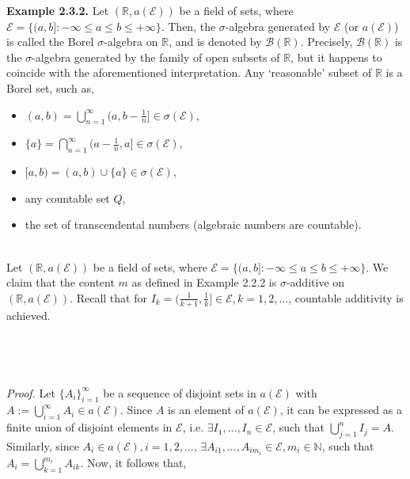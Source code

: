 \documentclass{article}
\begin{document}
\textbf{Example 2.3.2.} Let $(\mathbb{R}, a(\mathcal{E}))$ be a field of sets, where $\mathcal{E} = \{(a,b]: -\infty \leq a \leq b \leq +\infty\}$. Then, the $\sigma$-algebra generated by $\mathcal{E}$ (or $a(\mathcal{E})$) is called the Borel $\sigma$-algebra on $\mathbb{R}$, and is denoted by $\mathcal{B}(\mathbb{R})$. Precisely, $\mathcal{B}(\mathbb{R})$ is the $\sigma$-algebra generated by the family of open subsets of $\mathbb{R}$, but it happens to coincide with the aforementioned interpretation. Any ‘reasonable’ subset of $\mathbb{R}$ is a Borel set, such as,
\begin{itemize}
	\item $(a,b) = \bigcup_{n=1}^{\infty}(a, b - \frac{1}{n}] \in \sigma(\mathcal{E})$,
	\item $\{a\} = \bigcap_{n=1}^{\infty}(a - \frac{1}{n}, a] \in \sigma(\mathcal{E})$,
	\item $[a,b) = (a,b) \cup \{a\} \in \sigma(\mathcal{E})$,
	\item any countable set $Q$,
	\item the set of transcendental numbers (algebraic numbers are countable).
\end{itemize}
\ \\Let $(\mathbb{R},a(\mathcal{E}))$ be a field of sets, where $\mathcal{E} = \{(a,b]: -\infty \leq a \leq b \leq +\infty\}$. We claim that the content $m$ as defined in Example 2.2.2 is $\sigma$-additive on $(\mathbb{R},a(\mathcal{E}))$. Recall that for $I_k = (\frac{1}{k+1}, \frac{1}{k}] \in \mathcal{E}, k = 1,2,...$, countable additivity is achieved.\\\\
\noindent\fbox{%
	\parbox{\textwidth}{%
		\textbf{Lemma 2.3.1. Lebesgue measure on $(\mathbb{R}, a(\mathcal{E}))$} \\ The content $m: a(\mathcal{E}) \to [0,\infty)$ on $(\mathbb{R}, a(\mathcal{E}))$, where $m(A) = |A|, \ A \in a(\mathcal{E})$, is $\sigma$-additive.
	}%
}\\\\\\
\textit{Proof.} Let $\{A_i\}_{i=1}^{\infty}$ be a sequence of disjoint sets in $a(\mathcal{E})$ with $A := \bigcup_{i=1}^{\infty}A_i \in a(\mathcal{E})$. Since $A$ is an element of $a(\mathcal{E})$, it can be expressed as a finite union of disjoint elements in $\mathcal{E}$, i.e. $\exists I_1, ..., I_n \in \mathcal{E}$, such that $\bigcup_{j=1}^{n}I_j = A$. Similarly, since $A_i \in a(\mathcal{E}), i = 1,2,...$, $\exists A_{i1},...,A_{im_{i}} \in \mathcal{E}, m_i \in \mathbb{N}$, such that $A_i = \bigcup_{k=1}^{m_i}A_{ik}$. Now, it follows that,
\end{document}
